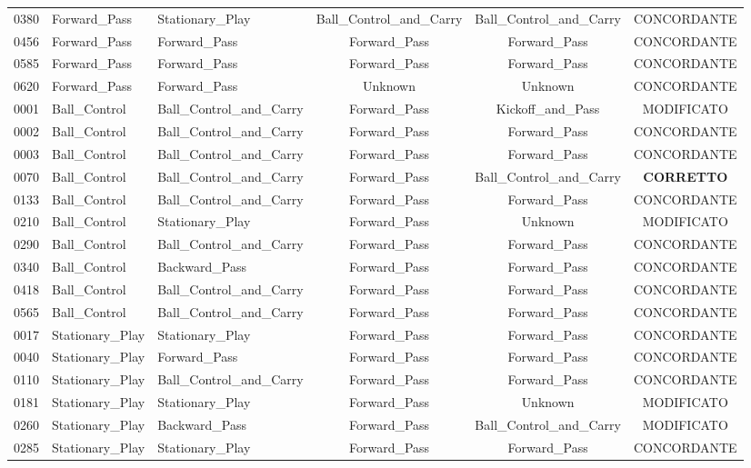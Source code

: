 \begin{table}[t]
\begin{tabular}{cllccc}
0380 & Forward\_Pass & Stationary\_Play & Ball\_Control\_and\_Carry & Ball\_Control\_and\_Carry & CONCORDANTE \\
0456 & Forward\_Pass & Forward\_Pass & Forward\_Pass & Forward\_Pass & CONCORDANTE \\
0585 & Forward\_Pass & Forward\_Pass & Forward\_Pass & Forward\_Pass & CONCORDANTE \\
0620 & Forward\_Pass & Forward\_Pass & Unknown & Unknown & CONCORDANTE \\
0001 & Ball\_Control & Ball\_Control\_and\_Carry & Forward\_Pass & Kickoff\_and\_Pass & MODIFICATO \\
0002 & Ball\_Control & Ball\_Control\_and\_Carry & Forward\_Pass & Forward\_Pass & CONCORDANTE \\
0003 & Ball\_Control & Ball\_Control\_and\_Carry & Forward\_Pass & Forward\_Pass & CONCORDANTE \\
0070 & Ball\_Control & Ball\_Control\_and\_Carry & Forward\_Pass & Ball\_Control\_and\_Carry & \textbf{CORRETTO} \\
0133 & Ball\_Control & Ball\_Control\_and\_Carry & Forward\_Pass & Forward\_Pass & CONCORDANTE \\
0210 & Ball\_Control & Stationary\_Play & Forward\_Pass & Unknown & MODIFICATO \\
0290 & Ball\_Control & Ball\_Control\_and\_Carry & Forward\_Pass & Forward\_Pass & CONCORDANTE \\
0340 & Ball\_Control & Backward\_Pass & Forward\_Pass & Forward\_Pass & CONCORDANTE \\
0418 & Ball\_Control & Ball\_Control\_and\_Carry & Forward\_Pass & Forward\_Pass & CONCORDANTE \\
0565 & Ball\_Control & Ball\_Control\_and\_Carry & Forward\_Pass & Forward\_Pass & CONCORDANTE \\
0017 & Stationary\_Play & Stationary\_Play & Forward\_Pass & Forward\_Pass & CONCORDANTE \\
0040 & Stationary\_Play & Forward\_Pass & Forward\_Pass & Forward\_Pass & CONCORDANTE \\
0110 & Stationary\_Play & Ball\_Control\_and\_Carry & Forward\_Pass & Forward\_Pass & CONCORDANTE \\
0181 & Stationary\_Play & Stationary\_Play & Forward\_Pass & Unknown & MODIFICATO \\
0260 & Stationary\_Play & Backward\_Pass & Forward\_Pass & Ball\_Control\_and\_Carry & MODIFICATO \\
0285 & Stationary\_Play & Stationary\_Play & Forward\_Pass & Forward\_Pass & CONCORDANTE \\

\end{tabular}
\end{table}
